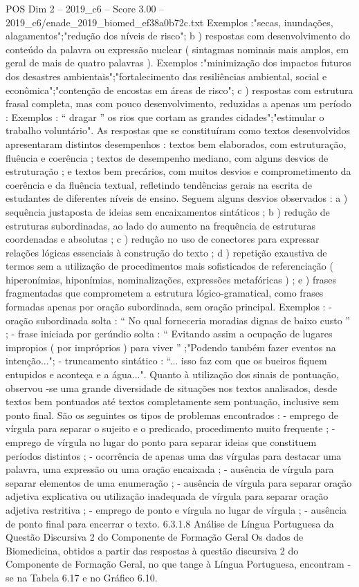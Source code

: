 \begin{textsample}{POS Dim 2 – 2019\_c6 – Score 3.00 – 2019\_c6/enade\_2019\_biomed\_ef38a0b72c.txt}
Exemplos :"secas, inundações, alagamentos";"redução dos níveis de risco"; b ) respostas com desenvolvimento do conteúdo da palavra ou expressão nuclear ( sintagmas nominais mais amplos, em geral de mais de quatro palavras ).
Exemplos :"minimização dos impactos futuros dos desastres ambientais";"fortalecimento das resiliências ambiental, social e econômica";"contenção de encostas em áreas de risco"; c ) respostas com estrutura frasal completa, mas com pouco desenvolvimento, reduzidas a apenas um período : Exemplos : “ dragar ” os rios que cortam as grandes cidades";"estimular o trabalho voluntário".
As respostas que se constituíram como textos desenvolvidos apresentaram distintos desempenhos : textos bem elaborados, com estruturação, fluência e coerência ; textos de desempenho mediano, com alguns desvios de estruturação ; e textos bem precários, com muitos desvios e comprometimento da coerência e da fluência textual, refletindo tendências gerais na escrita de estudantes de diferentes níveis de ensino.
Seguem alguns desvios observados : a ) sequência justaposta de ideias sem encaixamentos sintáticos ; b ) redução de estruturas subordinadas, ao lado do aumento na frequência de estruturas coordenadas e absolutas ; c ) redução no uso de conectores para expressar relações lógicas essenciais à construção do texto ; d ) repetição exaustiva de termos sem a utilização de procedimentos mais sofisticados de referenciação ( hiperonímias, hiponímias, nominalizações, expressões metafóricas ) ; e ) frases fragmentadas que comprometem a estrutura lógico-gramatical, como frases formadas apenas por oração subordinada, sem oração principal.
Exemplos : - oração subordinada solta : “ No qual forneceria moradias dignas de baixo custo ” ; - frase iniciada por gerúndio solta : “ Evitando assim a ocupação de lugares impropios ( por impróprios ) para viver ” ;"Podendo também fazer eventos na intenção..."; - truncamento sintático : “... isso faz com que os bueiros fiquem entupidos e aconteça e a água...".
Quanto à utilização dos sinais de pontuação, observou -se uma grande diversidade de situações nos textos analisados, desde textos bem pontuados até textos completamente sem pontuação, inclusive sem ponto final.
São os seguintes os tipos de problemas encontrados : - emprego de vírgula para separar o sujeito e o predicado, procedimento muito frequente ; - emprego de vírgula no lugar do ponto para separar ideias que constituem períodos distintos ; - ocorrência de apenas uma das vírgulas para destacar uma palavra, uma expressão ou uma oração encaixada ; - ausência de vírgula para separar elementos de uma enumeração ; - ausência de vírgula para separar oração adjetiva explicativa ou utilização inadequada de vírgula para separar oração adjetiva restritiva ; - emprego de ponto e vírgula no lugar de vírgula ; - ausência de ponto final para encerrar o texto. 6.3.1.8 Análise de Língua Portuguesa da Questão Discursiva 2 do Componente de Formação Geral Os dados de Biomedicina, obtidos a partir das respostas à questão discursiva 2 do Componente de Formação Geral, no que tange à Língua Portuguesa, encontram -se na Tabela 6.17 e no Gráfico 6.10.

\end{textsample}
